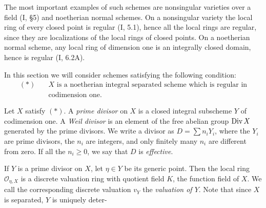 The most important examples of such schemes are nonsingular varieties over a
field (I, \S 5) and noetherian normal schemes. On a nonsingular variety the
local ring of every closed point is regular (I, 5.1), hence all the local
rings are regular, since they are localizations of the local rings of closed
points. On a noetherian normal scheme, any local ring of dimension one is an
integrally closed domain, hence is regular (I, 6.2A).

In this section we will consider schemes satisfying the following condition:
\[
  \begin{aligned}
    (*)\quad &X \text{ is a noetherian integral separated scheme which is
      regular in} \\
    &\text{codimension one.}
  \end{aligned}
\]

\begin{definition}
Let $X$ satisfy $(*)$. A \emph{prime divisor} on $X$ is a closed integral
subscheme $Y$ of codimension one. A \emph{Weil divisor} is an element of the
free abelian group $\operatorname{Div} X$ generated by the prime divisors. We write a
divisor as $D = \sum n_iY_i$, where the $Y_i$ are prime divisors, the $n_i$
are integers, and only finitely many $n_i$ are different from zero. If all
the $n_i \ge 0$, we say that $D$ is \emph{effective}.
\end{definition}

If $Y$ is a prime divisor on $X$, let $\eta \in Y$ be its generic point.
Then the local ring $\mathcal{O}_{\eta,X}$ is a discrete valuation ring with
quotient field $K$, the function field of $X$. We call the corresponding
discrete valuation $v_Y$ the \emph{valuation of $Y$}. Note that since $X$ is
separated, $Y$ is uniquely deter-
